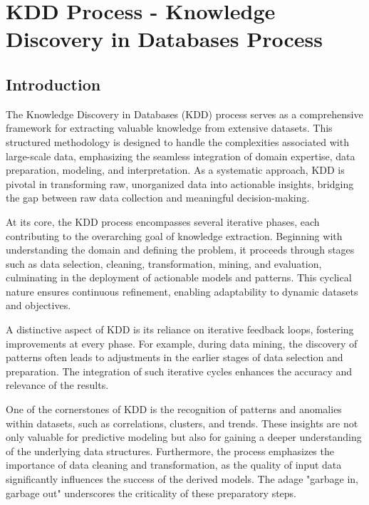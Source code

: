 %
%
\chapter{KDD Process - Knowledge Discovery in Databases Process}
\section{Introduction}

The Knowledge Discovery in Databases (KDD) process serves as a comprehensive framework for extracting valuable knowledge from extensive datasets. This structured methodology is designed to handle the complexities associated with large-scale data, emphasizing the seamless integration of domain expertise, data preparation, modeling, and interpretation. As a systematic approach, KDD is pivotal in transforming raw, unorganized data into actionable insights, bridging the gap between raw data collection and meaningful decision-making.

At its core, the KDD process encompasses several iterative phases, each contributing to the overarching goal of knowledge extraction. Beginning with understanding the domain and defining the problem, it proceeds through stages such as data selection, cleaning, transformation, mining, and evaluation, culminating in the deployment of actionable models and patterns. This cyclical nature ensures continuous refinement, enabling adaptability to dynamic datasets and objectives.

A distinctive aspect of KDD is its reliance on iterative feedback loops, fostering improvements at every phase. For example, during data mining, the discovery of patterns often leads to adjustments in the earlier stages of data selection and preparation. The integration of such iterative cycles enhances the accuracy and relevance of the results.

One of the cornerstones of KDD is the recognition of patterns and anomalies within datasets, such as correlations, clusters, and trends. These insights are not only valuable for predictive modeling but also for gaining a deeper understanding of the underlying data structures. Furthermore, the process emphasizes the importance of data cleaning and transformation, as the quality of input data significantly influences the success of the derived models. The adage "garbage in, garbage out" underscores the criticality of these preparatory steps.

